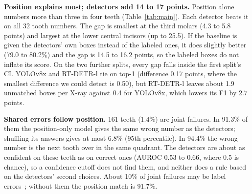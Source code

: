 \documentclass[runningheads]{llncs}
\begin{document}
\begin{table}[t]
\caption{Top-1 on 11,602 teeth (first split, 95\% CI) and each detector's gap
over the position-only model. F1 also penalizes extra boxes. The last column
gives the gap on the two further splits.}\label{tab:main}
\centering
\setlength{\tabcolsep}{3pt}
\end{table}

\textbf{Position explains most; detectors add 14 to 17 points.}
Position alone numbers more than three in four teeth (Table~\ref{tab:main}).
Each detector beats it on all 32 tooth numbers. The gap is smallest at the
third molars (4.3 to 5.8 points) and largest at the lower central incisors
(up to 25.5). If the baseline is given the detectors' own boxes instead of
the labeled ones, it does slightly better (79.0 to 80.2\%) and the gap is
14.5 to 16.2 points, so the labeled boxes do not inflate its score. On the
two further splits, every gap falls inside the first split's CI. YOLOv8x and
RT-DETR-l tie on top-1 (difference 0.17 points, where the smallest
difference we could detect is 0.50), but RT-DETR-l leaves about 1.9
unmatched boxes per X-ray against 0.4 for YOLOv8x, which lowers its F1 by
2.7 points.

\textbf{Shared errors follow position.} 161 teeth (1.4\%) are joint
failures. In 91.3\% of them the position-only model gives the same wrong
number as the detectors; shuffling its answers gives at most 6.8\% (95th
percentile). In 94.4\% the wrong number is the next tooth over in the same
quadrant. The detectors are about as confident on these teeth as on correct
ones (AUROC 0.53 to 0.66, where 0.5 is chance), so a confidence cutoff does
not find them, and neither does a rule based on the detectors' second
choices. About 10\% of joint failures may be label
errors~\cite{northcutt2021confident}; without them the position match is
91.7\%.
\end{document}
